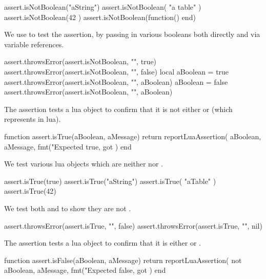 \startLuaTest
  assert.isNotBoolean("aString")
  assert.isNotBoolean({ "a table" })
  assert.isNotBoolean(42 )
  assert.isNotBoolean(function() end)
\stopLuaTest
\stopTestCase


We use  to test the  
assertion, by passing in various booleans both directly and via variable 
references. 

\startLuaTest
  assert.throwsError(assert.isNotBoolean, "", true)
  assert.throwsError(assert.isNotBoolean, "", false)
  local aBoolean = true
  assert.throwsError(assert.isNotBoolean, "", aBoolean)
  aBoolean = false
  assert.throwsError(assert.isNotBoolean, "", aBoolean)
\stopLuaTest
\stopTestCase

\stopTestSuite


The  assertion tests a lua object to confirm that it 
is not either  or  (which represents  
in lua). 

\startLuaCode
function assert.isTrue(aBoolean, aMessage)
  return reportLuaAssertion(
    aBoolean,
    aMessage,
    fmt("Expected true, got %
  )
end
\stopLuaCode


We test various lua objects which are neither  nor . 

\startLuaTest
  assert.isTrue(true)
  assert.isTrue("aString")
  assert.isTrue({ "aTable" })
  assert.isTrue(42)
\stopLuaTest
\stopTestCase


We test both  and  to show they are not 
. 

\startLuaTest
  assert.throwsError(assert.isTrue, "", false)
  assert.throwsError(assert.isTrue, "", nil)
\stopLuaTest
\stopTestCase

\stopTestSuite


The  assertion tests a lua object to confirm that it 
is either  or . 

\startLuaCode
function assert.isFalse(aBoolean, aMessage)
  return reportLuaAssertion(
    not aBoolean,
    aMessage,
    fmt("Expected false, got %
  )
end
\stopLuaCode


